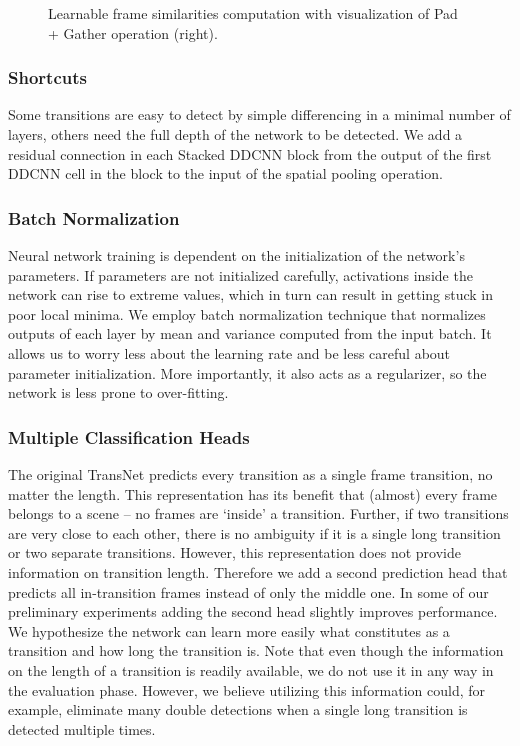 \begin{figure}
    \caption[Learnable frame similarities computation with visualization of Pad + Gather operation]{Learnable frame similarities computation with visualization of Pad + Gather operation (right).}
    \label{fig:frame_sim}
\end{figure}

\subsubsection{Shortcuts}
Some transitions are easy to detect by simple differencing in a minimal number of layers, others need the full depth of the network to be detected. We add a residual connection in each Stacked DDCNN block from the output of the first DDCNN cell in the block to the input of the spatial pooling operation.%

\subsubsection{Batch Normalization}
Neural network training is dependent on the initialization of the network's parameters. If parameters are not initialized carefully, activations inside the network can rise to extreme values, which in turn can result in getting stuck in poor local minima. We employ batch normalization technique \cite{BatchNormalization} that normalizes outputs of each layer by mean and variance computed from the input batch. It allows us to worry less about the learning rate and be less careful about parameter initialization. More importantly, it also acts as a regularizer, so the network is less prone to over-fitting.

\subsubsection{Multiple Classification Heads}
The original TransNet predicts every transition as a single frame transition, no matter the length. This representation has its benefit that (almost) every frame belongs to a scene -- no frames are `inside' a transition. Further, if two transitions are very close to each other, there is no ambiguity if it is a single long transition or two separate transitions. However, this representation does not provide information on transition length. Therefore we add a second prediction head that predicts all in-transition frames instead of only the middle one. 
In some of our preliminary experiments adding the second head slightly improves performance. We hypothesize the network can learn more easily what constitutes as a transition and how long the transition is. Note that even though the information on the length of a transition is readily available, we do not use it in any way in the evaluation phase. However, we believe utilizing this information could, for example, eliminate many double detections when a single long transition is detected multiple times.


